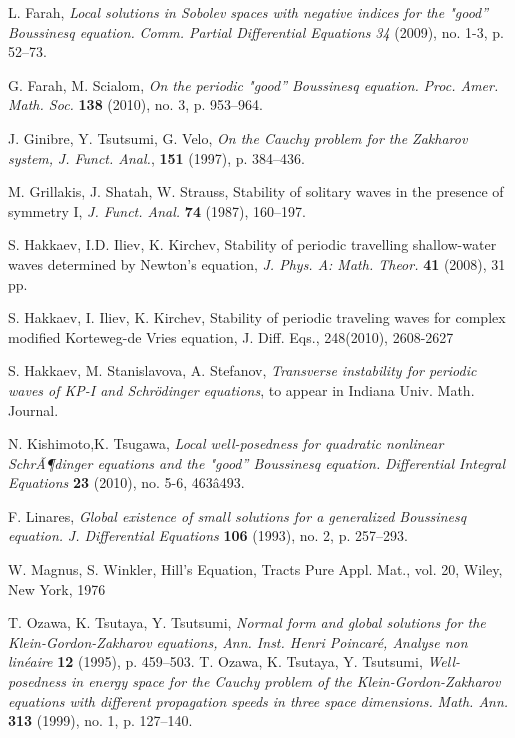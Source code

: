 \documentclass[final,11pt,leqno]{amsart}
\begin{document}
\begin{thebibliography}{100}
 L. Farah, \emph{Local solutions in Sobolev spaces with negative indices for the "good'' Boussinesq equation.} {\em Comm. Partial Differential Equations}
 {\em 34} (2009), no. 1-3, p. 52--73.

 G. Farah, M. Scialom,  \emph{
On the periodic "good'' Boussinesq equation.}
{\em Proc. Amer. Math. Soc.} {\bf 138} (2010), no. 3, p. 953--964.

 J. Ginibre, Y. Tsutsumi, G. Velo, \emph{On the Cauchy problem for the Zakharov system,} {\em J. Funct. Anal.}, {\bf 151} (1997), p. 384--436.

 M. Grillakis, J. Shatah, W. Strauss,  Stability
 of solitary waves in the presence of symmetry I, {\it J. Funct.
 Anal.} {\bf 74} (1987), 160--197.

 S. Hakkaev, I.D. Iliev, K. Kirchev,
 Stability of periodic travelling shallow-water waves determined by Newton's
 equation, {\it J. Phys. A: Math. Theor.} {\bf 41} (2008), 31 pp.

  S. Hakkaev, I. Iliev, K. Kirchev,
          Stability of periodic traveling waves for complex
          modified Korteweg-de Vries equation, J. Diff. Eqs.,
          248(2010), 2608-2627

  S. Hakkaev, M. Stanislavova, A. Stefanov, \emph{Transverse instability for periodic waves of KP-I and Schr\"odinger equations},
 to appear in Indiana Univ. Math. Journal.

 N. Kishimoto,K. Tsugawa, \emph{Local well-posedness for quadratic nonlinear SchrÃ¶dinger equations and the "good'' Boussinesq equation.}
{\em Differential Integral Equations}
{\bf 23} (2010), no. 5-6, 463â493.

 F. Linares, \emph{Global existence of small solutions for a generalized Boussinesq equation.} {\em J. Differential Equations}
{\bf 106} (1993), no. 2, p.
257--293.

  W. Magnus, S. Winkler, Hill's Equation,
          Tracts Pure Appl. Mat., vol. 20, Wiley, New York, 1976

  T. Ozawa, K. Tsutaya, Y. Tsutsumi, \emph{Normal form and global solutions for the Klein-Gordon-Zakharov equations,}
 {\em Ann. Inst. Henri Poincar\'e, Analyse non lin\'eaire} {\bf 12}  (1995), p. 459--503.
   T. Ozawa, K. Tsutaya, Y. Tsutsumi, \emph{Well-posedness in energy space for the Cauchy problem of the
  Klein-Gordon-Zakharov equations with different propagation speeds in three space dimensions.} {\em Math. Ann.} {\bf 313} (1999), no. 1, p. 127--140.


\end{thebibliography}
\end{document}
